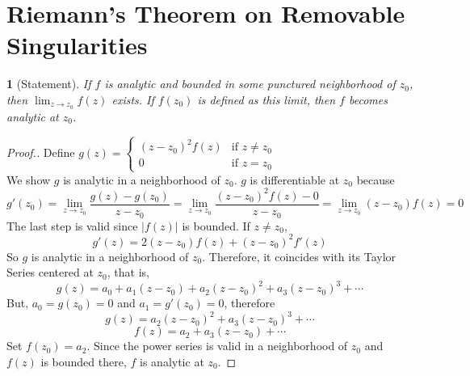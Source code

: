 \documentclass[12pt,letterpaper]{article}
\theoremstyle{named}
\newtheorem*{theorem}{}
\begin{document}
%

\section{Riemann's Theorem on Removable Singularities}
\begin{theorem}[Statement]
	If $f$ is analytic and bounded in some punctured neighborhood of $z_0$, then $\lim_{z \to z_0} f(z)$
	exists.  If $f(z_0)$ is defined as this limit, then $f$ becomes analytic at $z_0$.
\end{theorem}
\begin{proof}[Proof.]
Define $g(z) =
	\begin{cases}
		(z - z_0 )^2 f(z) & \text{if } z \neq z_0 \\
		0       & \text{if } z = z_0
	\end{cases}
$
\\ We show $g$ is analytic in a neighborhood of $z_0$.  $g$ is differentiable at $z_0$ because
$$ g'(z_0) = \lim_{z \to z_0} \frac{g(z) - g(z_0)}{z - z_0} = \lim_{z \to z_0} \frac{(z-z_0)^2 f(z) - 0}{z - z_0} = \lim_{z \to z_0} (z-z_0) f(z) = 0 $$
The last step is valid since $|f(z)|$ is bounded.  If $z \neq z_0$,
$$ g'(z) = 2(z-z_0)f(z) + (z-z_0)^2 f'(z) $$
So $g$ is analytic in a neighborhood of $z_0$.  Therefore, it coincides with its Taylor Series centered at $z_0$, that is,
$$ g(z) = a_0 + a_1 (z-z_0) + a_2 (z-z_0)^2 + a_3 (z-z_0)^3 + \cdots $$
But, $a_0 = g(z_0) = 0$ and $a_1 = g'(z_0) = 0$, therefore
$$ g(z) = a_2 (z-z_0)^2 + a_3 (z-z_0)^3 + \cdots $$
$$ f(z) = a_2 + a_3(z-z_0) + \cdots $$
Set $f(z_0) = a_2$.  Since the power series is valid in a neighborhood of $z_0$ and $f(z)$ is bounded there,
$f$ is analytic at $z_0$.
\end{proof}

%
\end{document}
